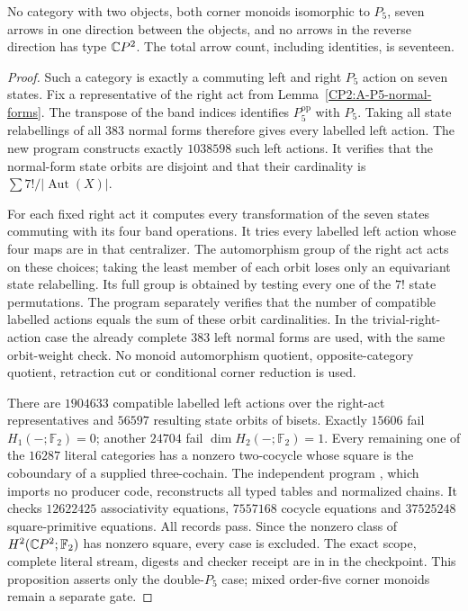 \begin{proposition}
\label{CP2:A-P5-P5-seven}
No category with two objects, both corner monoids isomorphic
to $P_5$, seven arrows in one direction between the objects,
and no arrows in the reverse direction has type $\mathbb{C}P^2$.
The total arrow count, including identities, is seventeen.
\end{proposition}
\begin{proof}
Such a category is exactly a commuting left and right $P_5$
action on seven states. Fix a representative of the right act
from Lemma~\ref{CP2:A-P5-normal-forms}. The transpose of the
band indices identifies $P_5^{\mathrm{op}}$ with $P_5$.
Taking all state relabellings of all $383$ normal forms therefore
gives every labelled left action. The new program
 constructs exactly $1038598$ such
left actions. It verifies that the normal-form state orbits are
disjoint and that their cardinality is
$\sum 7!/|\operatorname{Aut}(X)|$.

For each fixed right act it computes every transformation of
the seven states commuting with its four band operations.
It tries every labelled left action whose four maps are in
that centralizer. The automorphism group of the right act
acts on these choices; taking the least member of each orbit
loses only an equivariant state relabelling. Its full group
is obtained by testing every one of the $7!$ state permutations.
The program separately verifies that the number of compatible
labelled actions equals the sum of these orbit cardinalities.
In the trivial-right-action case the already complete $383$
left normal forms are used, with the same orbit-weight check.
No monoid automorphism quotient, opposite-category quotient,
retraction cut or conditional corner reduction is used.

There are $1904633$ compatible labelled left actions over the
right-act representatives and $56597$ resulting state orbits
of bisets. Exactly $15606$ fail $H_1(-;\mathbb F_2)=0$;
another $24704$ fail $\dim H_2(-;\mathbb F_2)=1$.
Every remaining one of the $16287$ literal categories has a
nonzero two-cocycle whose square is the coboundary of a supplied
three-cochain. The independent program
, which imports no producer
code, reconstructs all typed tables and normalized chains.
It checks $12622425$ associativity equations, $7557168$
cocycle equations and $37525248$ square-primitive equations.
All records pass. Since the nonzero class of $H^2(\mathbb{C}P^2;
\mathbb F_2)$ has nonzero square, every case is excluded.
The exact scope, complete literal stream, digests and checker
receipt are in  in the checkpoint.
This proposition asserts only the double-$P_5$ case; mixed
order-five corner monoids remain a separate gate.
\end{proof}

